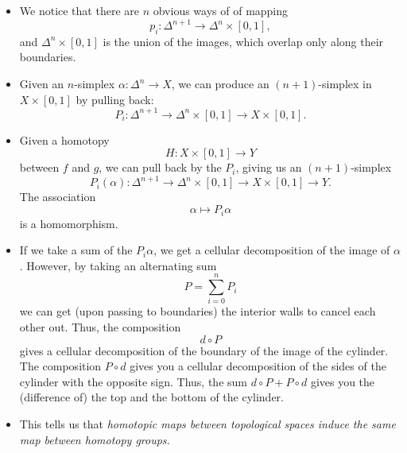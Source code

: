 \documentclass[main.tex]{subfiles}
\begin{document}
\begin{itemize}
  \item We notice that there are $n$ obvious ways of of mapping
    \begin{equation*}
      p_{i}\colon \Delta^{n+1} \to \Delta^{n} \times [0, 1],
    \end{equation*}
    and $\Delta^{n} \times [0, 1]$ is the union of the images, which overlap only along their boundaries.

  \item Given an $n$-simplex $\alpha\colon \Delta^{n} \to X$, we can produce an $(n+1)$-simplex in $X \times [0, 1]$ by pulling back:
    \begin{equation*}
      P_{i}\colon \Delta^{n+1} \to \Delta^{n} \times [0, 1] \to X \times [0, 1].
    \end{equation*}

  \item Given a homotopy
    \begin{equation*}
      H\colon X \times [0, 1] \to Y
    \end{equation*}
    between $f$ and $g$, we can pull back by the $P_{i}$, giving us an $(n+1)$-simplex
    \begin{equation*}
      P_{i}(\alpha)\colon \Delta^{n+1} \to \Delta^{n} \times [0, 1] \to X \times [0, 1] \to Y.
    \end{equation*}
    The association
    \begin{equation*}
      \alpha \mapsto P_{i}\alpha
    \end{equation*}
    is a homomorphism.

  \item If we take a sum of the $P_{i}\alpha$, we get a cellular decomposition of the image of $\alpha$. However, by taking an alternating sum
    \begin{equation*}
      P = \sum_{i = 0}^{n} P_{i}
    \end{equation*}
    we can get (upon passing to boundaries) the interior walls to cancel each other out. Thus, the composition
    \begin{equation*}
      d \circ P
    \end{equation*}
    gives a cellular decomposition of the boundary of the image of the cylinder. The composition $P \circ d$ gives you a cellular decomposition of the sides of the cylinder with the opposite sign. Thus, the sum $d \circ P + P \circ d$ gives you the (difference of) the top and the bottom of the cylinder.

  \item This tells us that \emph{homotopic maps between topological spaces induce the same map between homotopy groups.}
\end{itemize}
\end{document}
